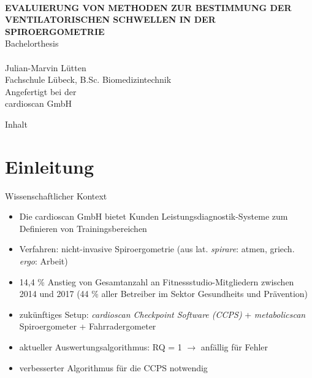 \documentclass[colorBG,slideColor,9pt]{beamer}
\newcommand{\talktitle}{Evaluierung von Methoden zur Bestimmung der ventilatorischen Schwellen in der Spiroergometrie}
\begin{document}
\begin{frame}
    \vspace{-10ex}
    \textcolor{fhlred}{\HRuleFill[0.4ex]} \\ \vspace{1ex}
    {\linespread{1.5}\selectfont
    \MakeUppercase{\bf \huge \talktitle}\\[5.5ex]}
    \normalsize Bachelorthesis\\
    \textcolor{fhlred}{\HRuleFill[0.1ex]} \\ \vspace{4ex}
    \small Julian-Marvin Lütten\\
    \small Fachschule Lübeck, B.Sc. Biomedizintechnik\\
    \vspace{2ex}
    \small Angefertigt bei der\\
    \small cardioscan GmbH
\end{frame}

\begin{frame}{Inhalt}
\tableofcontents
\end{frame}
\section{Einleitung}

\begin{frame}{Wissenschaftlicher Kontext}
\begin{itemize}
	\item Die cardioscan GmbH bietet Kunden Leistungsdiagnostik-Systeme zum Definieren von Trainingsbereichen 
	\item Verfahren: nicht-invasive Spiroergometrie (aus lat. \textsl{spirare}: atmen, griech. \textsl{ergo}: Arbeit)
	\item 14,4 \% Anstieg von Gesamtanzahl an Fitnessstudio-Mitgliedern zwischen 2014 und 2017 (44 \% aller Betreiber im Sektor Gesundheits und Prävention)
	\item zukünftiges Setup: \textsl{cardioscan Checkpoint Software (CCPS)} + \textsl{metabolicscan} Spiroergometer + Fahrradergometer
	\item aktueller Auswertungsalgorithmus: RQ = 1 $\rightarrow$ anfällig für Fehler
	\item verbesserter Algorithmus für die CCPS notwendig
\end{itemize}
\end{frame}
\end{document}
